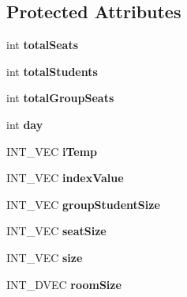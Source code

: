 \subsection*{\-Protected \-Attributes}
\begin{DoxyCompactItemize}
\item 
\hypertarget{classSeatPlan_a6915f74be45af73cda8c9a51b6cb99c9}{int {\bfseries total\-Seats}}\label{d2/d41/classSeatPlan_a6915f74be45af73cda8c9a51b6cb99c9}

\item 
\hypertarget{classSeatPlan_a3568dfc375740fd6b4075d7dc419a2e5}{int {\bfseries total\-Students}}\label{d2/d41/classSeatPlan_a3568dfc375740fd6b4075d7dc419a2e5}

\item 
\hypertarget{classSeatPlan_a18b1d6497343d6a9e751159dcdd8a179}{int {\bfseries total\-Group\-Seats}}\label{d2/d41/classSeatPlan_a18b1d6497343d6a9e751159dcdd8a179}

\item 
\hypertarget{classSeatPlan_acf6fa47342ec7f5675064c5601800f5c}{int {\bfseries day}}\label{d2/d41/classSeatPlan_acf6fa47342ec7f5675064c5601800f5c}

\item 
\hypertarget{classSeatPlan_a19a423aff33092a242f5dff5694efa37}{\-I\-N\-T\-\_\-\-V\-E\-C {\bfseries i\-Temp}}\label{d2/d41/classSeatPlan_a19a423aff33092a242f5dff5694efa37}

\item 
\hypertarget{classSeatPlan_af3fbce455c6744dee3fedb97442cd2c3}{\-I\-N\-T\-\_\-\-V\-E\-C {\bfseries index\-Value}}\label{d2/d41/classSeatPlan_af3fbce455c6744dee3fedb97442cd2c3}

\item 
\hypertarget{classSeatPlan_a6cb00329d2f0760f679d7e00958da879}{\-I\-N\-T\-\_\-\-V\-E\-C {\bfseries group\-Student\-Size}}\label{d2/d41/classSeatPlan_a6cb00329d2f0760f679d7e00958da879}

\item 
\hypertarget{classSeatPlan_a73de1d93e86c3a23406e0903c546ea2c}{\-I\-N\-T\-\_\-\-V\-E\-C {\bfseries seat\-Size}}\label{d2/d41/classSeatPlan_a73de1d93e86c3a23406e0903c546ea2c}

\item 
\hypertarget{classSeatPlan_a45d2c9c1d580d442bc15dcb50265d627}{\-I\-N\-T\-\_\-\-V\-E\-C {\bfseries size}}\label{d2/d41/classSeatPlan_a45d2c9c1d580d442bc15dcb50265d627}

\item 
\hypertarget{classSeatPlan_a52bafc6123bd54a8f95253c4693b2975}{\-I\-N\-T\-\_\-D\-V\-E\-C {\bfseries room\-Size}}\label{d2/d41/classSeatPlan_a52bafc6123bd54a8f95253c4693b2975}


\end{DoxyCompactItemize}
